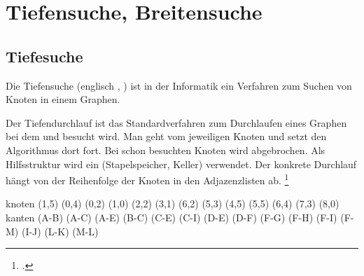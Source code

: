 \documentclass{lehramt-informatik}
\begin{document}

\chapter{Tiefensuche, Breitensuche}

\section{Tiefesuche}

\begin{quellen}
\item \cite[Seite 39-52 (PDF 32-45)]{aud:fs:6}
\item \cite{wiki:tiefensuche}
\item \cite[Kapitel 6.2.2.2 Graphalgorithmen, Seite 185]{schneider}
\end{quellen}

Die Tiefensuche (englisch , ) ist
in der Informatik ein Verfahren zum Suchen von Knoten in einem Graphen.

Der Tiefendurchlauf ist das Standardverfahren zum Durchlaufen eines
Graphen bei dem  und  besucht wird. Man geht vom jeweiligen Knoten
 und setzt den
Algorithmus dort  fort. Bei schon besuchten Knoten wird
abgebrochen. Als Hilfsstruktur wird ein  (Stapelspeicher,
Keller) verwendet. Der konkrete Durchlauf hängt von der Reihenfolge der
Knoten in den Adjazenzlisten ab.
\footcite[Seite 40 (PDF 33)]{aud:fs:6}

\def\TmpGraph{
  \graph knoten {
    \knoten{A}(1,5)
    \knoten{B}(0,4)
    \knoten{C}(0,2)
    \knoten{D}(1,0)
    \knoten{E}(2,2)
    \knoten{F}(3,1)
    \knoten{G}(6,2)
    \knoten{H}(5,3)
    \knoten{I}(4,5)
    \knoten{J}(5,5)
    \knoten{K}(6,4)
    \knoten{L}(7,3)
    \knoten{M}(8,0)
  } kanten {
    \kanteO(A-B)
    \kanteO(A-C)
    \kanteO(A-E)
    \kanteO(B-C)
    \kanteO(C-E)
    \kanteO(C-I)
    \kanteO(D-E)
    \kanteO(D-F)
    \kanteO(F-G)
    \kanteO(F-H)
    \kanteO(F-I)
    \kanteO(F-M)
    \kanteO(I-J)
    \kanteO(L-K)
    \kanteO(M-L)
  }
}

\TmpGraph

\def\TmpBesuch#1{\strut\par\textbf{Besuchte Knoten:} #1}
\def\TmpStack#1{\par\textbf{Stack:} #1}
\end{document}
